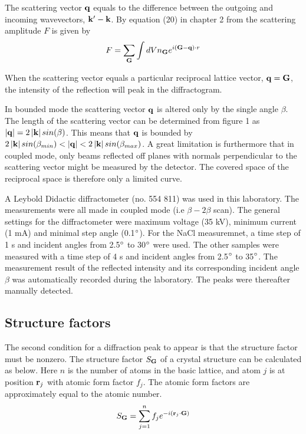 \documentclass[a4paper,twoside=false,abstract=false,numbers=noenddot,
titlepage=false,headings=small,parskip=half,version=last]{scrartcl}
\begin{document}
The scattering vector $\bold{q}$ equals to the difference between the outgoing and incoming wavevectors,
$\bold{k}' - \bold{k}$. By equation (20) in chapter 2 from \cite{Kittel} the scattering
amplitude $F$ is given by
\begin{equation}
    \label{eq:scatamp}
    F = \sum_\bold{G} \int dV n_{\bold{G}} e^{i(\bold{G}-\bold{q})\cdot r}
\end{equation}

When the scattering vector equals a particular reciprocal lattice vector, $\bold{q} = \bold{G}$, the intensity of the reflection will peak in the diffractogram. 


In bounded mode the scattering vector $\bold{q}$ is altered only by the single angle $\beta$.
The length of the scattering vector can be determined from figure 1 as $\left\vert \bold{q} \right\vert = 2 \left\vert \bold{k} \right\vert sin(\beta)$.
This means that $\bold{q}$ is bounded by $2 \left\vert \bold{k} \right\vert sin(\beta_{min}) < \left\vert \bold{q} \right\vert < 2 \left\vert \bold{k} \right\vert sin(\beta_{max})$.
A great limitation is furthermore that in coupled mode, only beams reflected off planes with normals perpendicular to the scattering vector might be measured by the detector. The covered space of the reciprocal space is therefore only a limited curve.


A Leybold Didactic diffractometer (no. 554 811) was used in this laboratory. The measurements were all made in coupled mode (i.e $\beta-2\beta$ scan). The general settings for the diffractometer were maximum voltage (35 kV), minimum current (1 mA) and minimal step angle (0.1$\degree$). For the NaCl measuremnet, a time step of 1 s and incident angles from 2.5$\degree$ to 30$\degree$ were used. The other samples were measured with a time step of 4 s and incident angles from 2.5$\degree$ to 35$\degree$. The measurement result of the reflected intensity and its corresponding incident angle $\beta$ was automatically recorded during the laboratory. The peaks were thereafter manually detected.


\subsection{Structure factors}
The second condition for a diffraction peak to appear is that the structure factor must be nonzero.
The structure factor $S_{\bold{G}}$ of a crystal structure can be calculated as below. Here $n$ is the number of atoms in the basic lattice, and atom $j$ is at position $\bold{r}_j$ with atomic form factor $f_j$. The atomic form factors are approximately equal to the atomic number.\\
\begin{equation}
    S_{\bold{G}} = \sum^n_{j=1} f_j e^{-i \left( \bold{r}_j \cdot \bold{G}\right)}
\end{equation}
\end{document}
